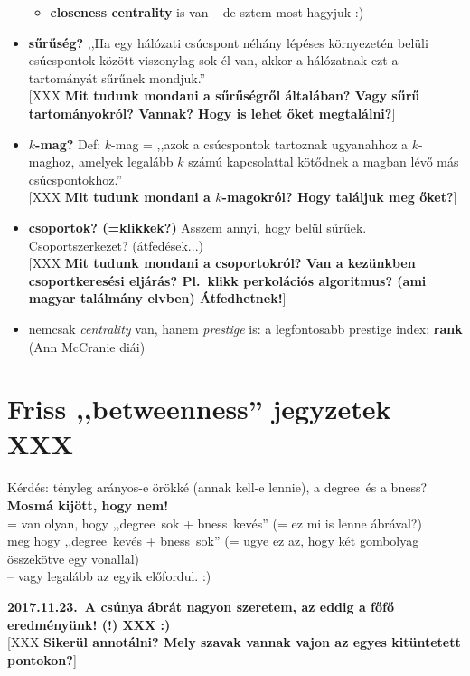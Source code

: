 \documentclass{llncs}
\newcommand{\embf}[1]{\textbf{#1}}
\newcommand{\XXX}[1]{{\small \color{megjcolor} [XXX #1]}}
\newcommand{\XXXb}[1]{\XXX{\embf{#1}}}
\newcommand{\degree}{degree} %
\newcommand{\bness}{bness}   %
\begin{document}
\begin{itemize}
\begin{itemize}
\item \embf{closeness centrality} is van -- de sztem most hagyjuk :)

\end{itemize}

\item 
\embf{sűrűség?} 
,,Ha egy hálózati csúcspont néhány lépéses környezetén belüli csúcspontok között viszonylag sok él van, akkor a hálózatnak ezt a tartományát sűrűnek mondjuk.''\\
\XXXb{Mit tudunk mondani a sűrűségről általában? Vagy sűrű tartományokról? Vannak? Hogy is lehet őket megtalálni?}

\item
\embf{$k$-mag?}
Def: $k$-mag = ,,azok a csúcspontok tartoznak ugyanahhoz a $k$-maghoz, amelyek legalább $k$ számú kapcsolattal kötődnek a magban lévő más csúcspontokhoz.''\\
\XXXb{Mit tudunk mondani a $k$-magokról? Hogy találjuk meg őket?}

\item
\embf{csoportok? (=klikkek?)}
Asszem annyi, hogy belül sűrűek. Csoportszerkezet? (átfedések...)\\
\XXXb{Mit tudunk mondani a csoportokról?
Van a kezünkben csoportkeresési eljárás?
Pl.\ klikk perkolációs algoritmus? (ami magyar találmány elvben)
Átfedhetnek!}

\item
nemcsak \emph{centrality} van, hanem \emph{prestige} is:
a legfontosabb prestige index: \embf{rank} (Ann McCranie diái)

\end{itemize}


\newpage %

\section{Friss ,,betweenness'' jegyzetek XXX}

Kérdés: tényleg arányos-e örökké (annak kell-e lennie),
a \degree\ és a \bness?\\
\embf{Mosmá kijött, hogy nem!}\\
= van olyan, hogy ,,\degree\ sok + \bness\ kevés''
(= ez mi is lenne ábrával?)\\
meg hogy ,,\degree\ kevés + \bness\ sok''
(= ugye ez az, hogy két gombolyag összekötve egy vonallal)\\
-- vagy legalább az egyik előfordul. :)

\embf{2017.11.23.\ A csúnya ábrát nagyon szeretem,
az eddig a főfő eredményünk! (!) XXX :)}\\
\XXXb{Sikerül annotálni?
Mely szavak vannak vajon az egyes kitüntetett pontokon?}
\end{document}
